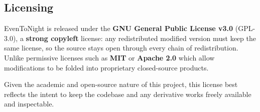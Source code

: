 \subsection{Licensing}

EvenToNight is released under the \textbf{GNU General Public License v3.0} (GPL-3.0), a \textbf{strong copyleft} license: any redistributed modified version must keep the same license, so the source stays open through every chain of redistribution. Unlike permissive licenses such as \textbf{MIT} or \textbf{Apache 2.0} which allow modifications to be folded into proprietary closed-source products.

Given the academic and open-source nature of this project, this license best reflects the intent to keep the codebase and any derivative works freely available and inspectable.
